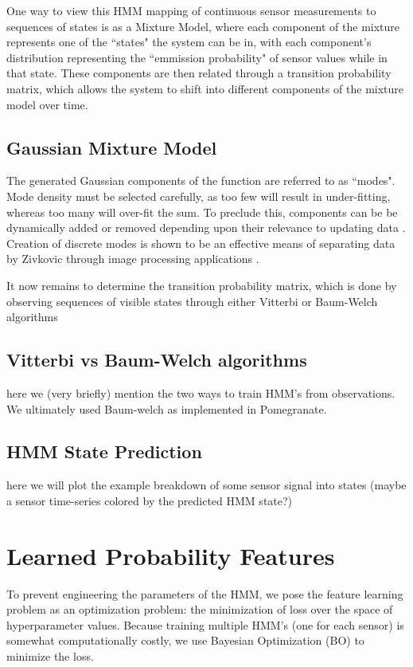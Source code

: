 \documentclass[twocolumn,10pt]{article}
\begin{document}
One way to view this HMM mapping of continuous sensor measurements to sequences of states is as a Mixture Model, where each component of the mixture represents one of the ``states" the system can be in, with each component's distribution representing the ``emmission probability" of sensor values while in that state. These components are then related through a transition probability matrix, which allows the system to shift into different components of the mixture model over time. 

\subsection{Gaussian Mixture Model}\label{sec:gmm}
The generated Gaussian components of the function are referred to as ``modes". Mode density must be selected carefully, as too few will result in under-fitting, whereas too many will over-fit the sum. To preclude this, components can be be dynamically added or removed depending upon their relevance to updating data \cite{GMM}. Creation of discrete modes is shown to be an effective means of separating data by Zivkovic through image processing applications \cite{GMM}.

It now remains to determine the transition probability matrix, which is done by observing sequences of visible states through either Vitterbi or Baum-Welch algorithms


\subsection{Vitterbi vs Baum-Welch algorithms}
here we (very briefly) mention the two ways to train HMM's from observations. We ultimately used Baum-welch as implemented in Pomegranate.\citep{pomegranate}

\subsection{HMM State Prediction}
here we will plot the example breakdown of some sensor signal into states (maybe a sensor time-series colored by the predicted HMM state?)

\section{Learned Probability Features }
To prevent engineering the parameters of the HMM, we pose the feature learning problem as an optimization problem: the minimization of loss over the space of hyperparameter values. Because training multiple HMM's (one for each sensor) is somewhat computationally costly, we use Bayesian Optimization (BO) to minimize the loss. 
\end{document}

